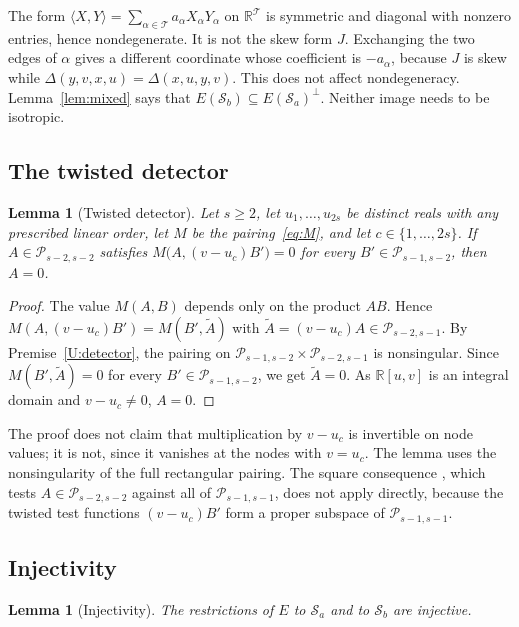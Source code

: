 \documentclass[11pt,a4paper]{article}
\newtheorem{lemma}[theorem]{Lemma}
\theoremstyle{definition}
\theoremstyle{remark}
\numberwithin{equation}{section}
\newcommand{\R}{\mathbb R}
\newcommand{\PP}{\mathcal P}
\newcommand{\SSS}{\mathcal S}
\newcommand{\TT}{\mathcal T}
\begin{document}
The form $\langle X,Y\rangle=\sum_{\alpha\in\TT}a_\alpha X_\alpha Y_\alpha$ on $\R^\TT$ is symmetric and diagonal with nonzero entries, hence nondegenerate. It is not the skew form $J$. Exchanging the two edges of $\alpha$ gives a different coordinate whose coefficient is $-a_\alpha$, because $J$ is skew while $\Delta(y,v,x,u)=\Delta(x,u,y,v)$. This does not affect nondegeneracy. Lemma~\ref{lem:mixed} says that $E(\SSS_b)\subseteq E(\SSS_a)^\perp$. Neither image needs to be isotropic.

\subsection{The twisted detector}

\begin{lemma}[Twisted detector]\label{lem:twisted}
Let $s\ge2$, let $u_1,\dots,u_{2s}$ be distinct reals with any prescribed linear order, let $M$ be the pairing~\eqref{eq:M}, and let $c\in\{1,\dots,2s\}$. If $A\in\PP_{s-2,s-2}$ satisfies $M\bigl(A,(v-u_c)B'\bigr)=0$ for every $B'\in\PP_{s-1,s-2}$, then $A=0$.
\end{lemma}

\begin{proof}
The value $M(A,B)$ depends only on the product $AB$. Hence $M(A,(v-u_c)B')=M(B',\tilde A)$ with $\tilde A=(v-u_c)A\in\PP_{s-2,s-1}$. By Premise~\ref{U:detector}, the pairing on $\PP_{s-1,s-2}\times\PP_{s-2,s-1}$ is nonsingular. Since $M(B',\tilde A)=0$ for every $B'\in\PP_{s-1,s-2}$, we get $\tilde A=0$. As $\R[u,v]$ is an integral domain and $v-u_c\ne0$, $A=0$.
\end{proof}

The proof does not claim that multiplication by $v-u_c$ is invertible on node values; it is not, since it vanishes at the nodes with $v=u_c$. The lemma uses the nonsingularity of the full rectangular pairing. The square consequence \cite[equation \texttt{eq:detector}]{OAIKn}, which tests $A\in\PP_{s-2,s-2}$ against all of $\PP_{s-1,s-1}$, does not apply directly, because the twisted test functions $(v-u_c)B'$ form a proper subspace of $\PP_{s-1,s-1}$.

\subsection{Injectivity}

\begin{lemma}[Injectivity]\label{lem:injective}
The restrictions of $E$ to $\SSS_a$ and to $\SSS_b$ are injective.
\end{lemma}
\end{document}

